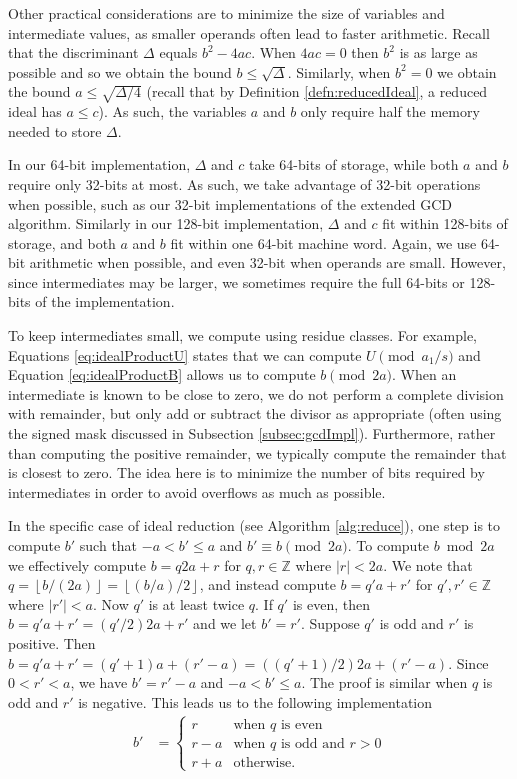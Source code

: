 \documentclass{ucalgthes1}
\theoremstyle{definition}
\newcommand{\ZZ}{\mathbb{Z}}
\newcommand{\floor}[1]{\left\lfloor #1 \right\rfloor}
\begin{document}
Other practical considerations are to minimize the size of variables and intermediate values, as smaller operands often lead to faster arithmetic.  Recall that the discriminant $\Delta$ equals $b^2 - 4ac$.  When $4ac=0$ then $b^2$ is as large as possible and so we obtain the bound $b \le \sqrt\Delta$.  Similarly, when $b^2 = 0$ we obtain the bound $a \le \sqrt{\Delta/4}$ (recall that by Definition \ref{defn:reducedIdeal}, a reduced ideal has $a \le c$).  As such, the variables $a$ and $b$ only require half the memory needed to store $\Delta$.

In our 64-bit implementation, $\Delta$ and $c$ take 64-bits of storage, while both $a$ and $b$ require only 32-bits at most.  As such, we take advantage of 32-bit operations when possible, such as our 32-bit implementations of the extended GCD algorithm.  Similarly in our 128-bit implementation, $\Delta$ and $c$ fit within 128-bits of storage, and both $a$ and $b$ fit within one 64-bit machine word.  Again, we use 64-bit arithmetic when possible, and even 32-bit when operands are small.  However, since intermediates may be larger, we sometimes require the full 64-bits or 128-bits of the implementation.

To keep intermediates small, we compute using residue classes.  For example, Equations \ref{eq:idealProductU} states that we can compute $U \pmod {a_1/s}$ and Equation \ref{eq:idealProductB} allows us to compute $b \pmod{2a}$.  When an intermediate is known to be close to zero, we do not perform a complete division with remainder, but only add or subtract the divisor as appropriate (often using the signed mask discussed in Subsection \ref{subsec:gcdImpl}).  Furthermore, rather than computing the positive remainder, we typically compute the remainder that is closest to zero.  The idea here is to minimize the number of bits required by intermediates in order to avoid overflows as much as possible.

In the specific case of ideal reduction (see Algorithm \ref{alg:reduce}), one step is to compute $b'$ such that $-a < b' \le a$ and $b' \equiv b \pmod{2a}$.  To compute $b \bmod{2a}$ we effectively compute $b = q2a + r$ for $q, r \in \ZZ$ where $|r| < 2a$.  We note that $q = \floor{b/(2a)} = \floor{(b/a)/2}$, and instead compute $b = q'a+r'$ for $q', r' \in \ZZ$ where $|r'| < a$.  Now $q'$ is at least twice $q$.  If $q'$ is even, then $b = q'a + r' = (q'/2)2a + r'$ and we let $b' = r'$. Suppose $q'$ is odd and $r'$ is positive.  Then $b = q'a + r' = (q' + 1)a + (r' - a) = ((q' + 1)/2)2a + (r' - a)$.  Since $0 < r' < a$, we have $b' = r' - a$ and $-a < b' \le a$.  The proof is similar when $q$ is odd and $r'$ is negative. This leads us to the following implementation
\begin{align*}
	b' &= \begin{cases}
		r & \textrm{when $q$ is even} \\
		r - a & \textrm{when $q$ is odd and $r > 0$} \\
		r + a & \textrm{otherwise.}
	\end{cases}
\end{align*}
\end{document}
